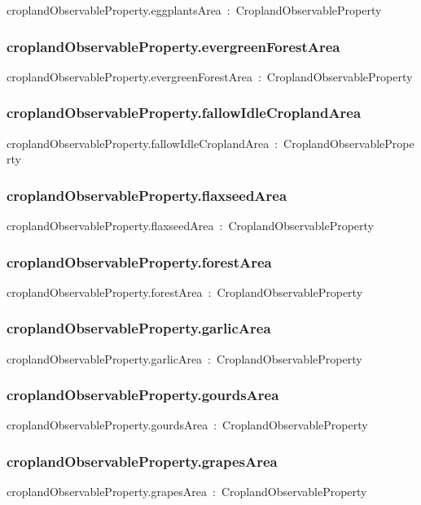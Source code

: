 \documentclass{article}
\begin{document}
croplandObservableProperty.eggplantsArea~:~CroplandObservableProperty

\subsubsection*{croplandObservableProperty.evergreenForestArea}

croplandObservableProperty.evergreenForestArea~:~CroplandObservableProperty

\subsubsection*{croplandObservableProperty.fallowIdleCroplandArea}

croplandObservableProperty.fallowIdleCroplandArea~:~CroplandObservableProperty

\subsubsection*{croplandObservableProperty.flaxseedArea}

croplandObservableProperty.flaxseedArea~:~CroplandObservableProperty

\subsubsection*{croplandObservableProperty.forestArea}

croplandObservableProperty.forestArea~:~CroplandObservableProperty

\subsubsection*{croplandObservableProperty.garlicArea}

croplandObservableProperty.garlicArea~:~CroplandObservableProperty

\subsubsection*{croplandObservableProperty.gourdsArea}

croplandObservableProperty.gourdsArea~:~CroplandObservableProperty

\subsubsection*{croplandObservableProperty.grapesArea}

croplandObservableProperty.grapesArea~:~CroplandObservableProperty
\end{document}
